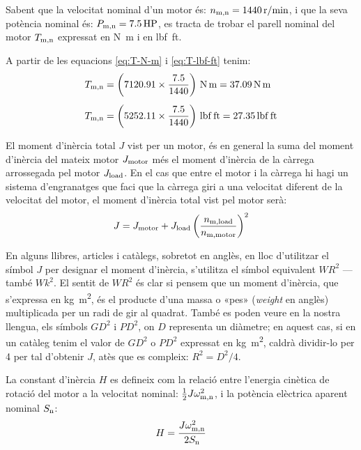 	
\begin{exemple}[\MotorParellNom{}]
	\addcontentsxms{\MotorParellNom}
    Sabent que la velocitat nominal d'un motor és: $n_\mathrm{m,n} = \qty{1440}{r/min}$, i que la seva potència nominal és: $P_\mathrm{m,n} = \qty{7,5}{HP}$,   es tracta de trobar el parell nominal del motor $T_\mathrm{m,n}$ expressat en \unit{N.m} i en \unit{lbf.ft}.

    A partir de les equacions  \eqref{eq:T-N-m} i \eqref{eq:T-lbf-ft} tenim:
    \begin{align*}
      T\ped{m,n} &= \left(\num{7120,91} \times \frac{\num{7,5}}{1440}\right)
      \,\unit{N.m} = \qty{37,09}{N.m} \\[1ex]
      T\ped{m,n} &= \left(\num{5252,11} \times \frac{\num{7,5}}{1440}\right)
      \,\unit{lbf.ft} = \qty{27,35}{lbf.ft}
    \end{align*}
\end{exemple}


El moment d'inèrcia total $J$ vist per un motor, és en general la suma del moment d'inèrcia del mateix motor  $J_\mathrm{motor}$ més el moment d'inèrcia de la càrrega arrossegada pel motor $J_\mathrm{load}$. En el cas que entre el motor i la càrrega hi hagi un sistema d'engranatges que faci que la càrrega giri a una velocitat diferent de la velocitat del motor, el  moment d'inèrcia total vist pel motor serà:
\begin{equation}\index{moment!d'inèrcia}\index{J@$J$}
    J = J\ped{motor} +  J\ped{load}
    \left(\frac{n\ped{m,load}}{n\ped{m,motor}}\right)^2
\end{equation}

En alguns llibres, articles i catàlegs, sobretot en anglès, en lloc d'utilitzar el símbol $J$ per designar el moment d'inèrcia, s'utilitza el símbol equivalent $WR^2$ ---també $Wk^2$. El sentit de $WR^2$ és clar si pensem que un moment d'inèrcia, que s'expressa en \unit{kg.m^2},  és el producte d'una massa o «pes» (\textit{weight} en anglès) multiplicada per un radi de gir al quadrat. També es poden veure en la nostra llengua, els símbols $GD^2$ i $PD^2$, on $D$ representa un diàmetre; en aquest cas, si en un catàleg tenim el valor de $GD^2$ o $PD^2$ expressat en \unit{kg.m^2}, caldrà dividir-lo per 4 per tal d'obtenir $J$, atès que es compleix: $R^2 = D^2/4$.

La constant d'inèrcia $H$ es defineix com la relació entre l'energia cinètica de rotació del motor  a la velocitat nominal: $\frac{1}{2} J \omega_\mathrm{m,n}^2$, i la  potència elèctrica aparent nominal $S_\mathrm{n}$:
\begin{equation}\index{constants!d'inèrcia}\index{H@$H$}
    H = \frac{J \omega\ped{m,n}^2}{2 S\ped{n}}
\end{equation}

